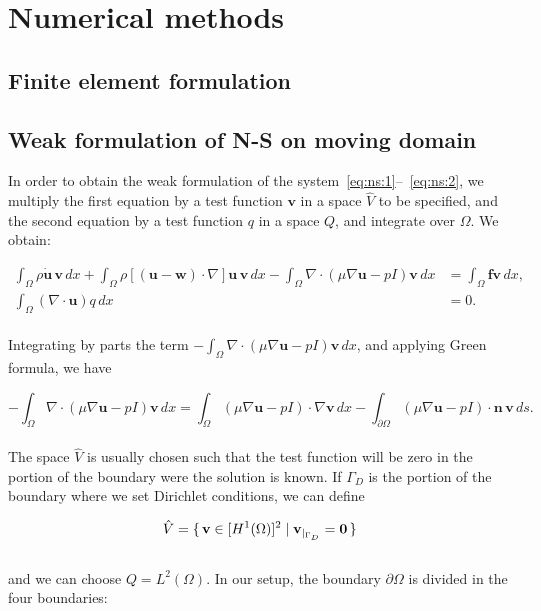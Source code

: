 \documentclass[11pt,a4paper,titlepage]{report}
\begin{document}
\chapter{Numerical methods}

\section{Finite element formulation}

\section{Weak formulation of N-S on moving domain}
In order to obtain the weak formulation of the system~\eqref{eq:ns:1}--~\eqref{eq:ns:2}, we multiply the first equation by a test function $\mathbf{v}$ in a space $\hat{V}$ to be specified, and the second equation by a test function $q$ in a space $Q$, and integrate over $\Omega$. 
We obtain:

\begin{align}
\int_{\Omega} \rho \dot{\mathbf{u}} \, \mathbf{v} \, dx
+ \int_{\Omega} \rho [(\mathbf{u - w}) \cdot \nabla] \mathbf{u} \, \mathbf{v} \, dx
- \int_{\Omega} \nabla \cdot (\mu \nabla \mathbf{u} - pI)\mathbf{v} \, dx
&= \int_{\Omega} \mathbf{f} \mathbf{v} \, dx, \\
\int_{\Omega}  (\nabla \cdot \mathbf{u}) q \, dx &= 0.
\end{align}
\\
Integrating by parts the term $- \int_{\Omega} \nabla \cdot (\mu \nabla \mathbf{u} - pI)\mathbf{v} \, dx$, and applying Green formula, we have

\[
- \int_{\Omega} \nabla \cdot (\mu \nabla \mathbf{u} - pI)\mathbf{v} \, dx =  \int_{\Omega} (\mu \nabla \mathbf{u} - pI) \cdot \nabla \mathbf{v} \, dx - \int_{\partial \Omega} (\mu \nabla \mathbf{u} - pI) \cdot \mathbf{n} \, \mathbf{v} \, ds.
\]
\\
The space $\hat{V}$ is usually chosen such that the test function will be zero in the portion of the boundary were the solution is known. If $\Gamma_D$ is the portion of the boundary where we set Dirichlet conditions, we can define

\begin{equation}
\hat{V} = \set{\mathbf{v} \in [H^1(\Omega)]^2 | \mathbf{v}_{|_{\Gamma_D}} = \mathbf{0}} 
\end{equation}
\\
and we can choose $Q = L^2(\Omega)$. In our setup, the boundary $\partial \Omega$ is divided in the four boundaries:
\end{document}
